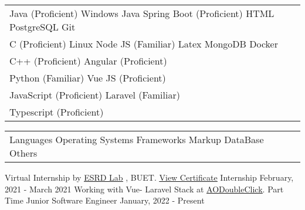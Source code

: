 \documentclass[]{awesome-cv}
\begin{document}
\begin{cventries}
	\cventry
	{\def\arraystretch{1.15}{\begin{tabular}{ l l }
				Java (Proficient) \hspace{1.2cm} Windows \hspace{1.6cm}  Java Spring Boot (Proficient) \hspace{1cm} HTML \hspace{1.2cm} PostgreSQL \hspace{1.4cm} Git  & {\skill{ }} \\
				C (Proficient) \hspace{1.6cm} Linux \hspace{2.8cm} Node JS (Familiar)  \hspace{1.6cm} Latex \hspace{1.4cm} MongoDB \hspace{1.4cm} Docker & {\skill{ }} \\
				C++ (Proficient) \hspace{4.7cm} Angular (Proficient) \hspace{1.4cm}   & {\skill{ }} \\
				Python (Familiar) \hspace{4.7cm} Vue JS (Proficient)  & {\skill{ }} \\
				JavaScript (Proficient) \hspace{4.1cm} Laravel (Familiar) & {\skill{ }} \\ Typescript (Proficient)  & {\skill{ }} \\
	\end{tabular}}}
	{\def\arraystretch{1.15}{\begin{tabular}{ l l }
		Languages \hspace{1cm} Operating Systems \hspace{1.2cm} Frameworks \hspace{1.5cm} Markup \hspace{1cm} DataBase \hspace{1cm} Others  & {\skill{ }} \\
		\end{tabular}}}
	{}
	{}
	{}
	
\end{cventries}

\vspace{-7mm}


\begin{cventries}
	\cventry
	{Virtual Internship by \href{http://vinternship.org/}{\underline{ESRD Lab}} , BUET.  \href{https://drive.google.com/drive/u/0/folders/1sx3UMH5gBBTkda5ivJqcNqGb4bhuACwu}{\underline{View Certificate}}}
	{Internship}
	{}
	{February, 2021 - March 2021}
	{}
	\cventry
	{Working with Vue- Laravel Stack at \href{https://aodoubleclick.com/}{\underline{AODoubleClick}}.}
	{Part Time Junior Software Engineer}
	{}
	{January, 2022 - Present}
	{}
\end{cventries}
\end{document}
